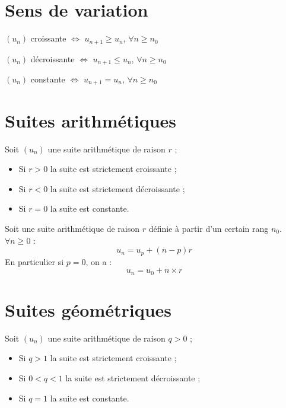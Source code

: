 \documentclass[11pt]{article}
\begin{document}
\begin{multicols}{2}

\section{Sens de variation}

\begin{definition}
$(u_n)$ croissante $\iff$ $u_{n+1}
\ge u_n$, $\forall n \ge n_0$
\end{definition}

\begin{definition}
$(u_n)$ décroissante $\iff$ $u_{n+1}
\le u_n$, $\forall n \ge n_0$
\end{definition}

\begin{definition}
$(u_n)$ constante $\iff$ $u_{n+1}
= u_n$, $\forall n \ge n_0$
\end{definition}

\section{Suites arithmétiques}

\begin{propriete}
Soit $(u_n)$ une suite arithmétique de raison $r$ ;
\begin{itemize}
\item Si $r > 0$ la suite est strictement croissante ;
\item Si $r < 0$ la suite est strictement décroissante ;
\item Si $r = 0$ la suite est constante.
\end{itemize}
\end{propriete}

\begin{theoreme}
Soit une suite arithmétique de raison $r$ définie à partir d'un
certain rang $n_0$.\\
$\forall n \ge 0$ :
\[ u_n = u_{p}+(n-p)r\]
En particulier si $p=0$, on a : 
\[ u_n = u_0 + n \times r\]
\end{theoreme}

\section{Suites géométriques}

\begin{propriete}
Soit $(u_n)$ une suite arithmétique de raison $q>0$ ;
\begin{itemize}
\item Si $q > 1$ la suite est strictement croissante ;
\item Si $0 < q < 1$ la suite est strictement décroissante ;
\item Si $q = 1$ la suite est constante.
\end{itemize}
\end{propriete}


\end{multicols}
\end{document}
